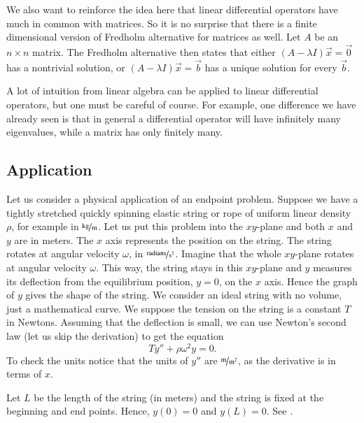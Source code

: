 \documentclass[12pt]{book}
\begin{document}
We also want to reinforce the idea here that linear differential operators have
much in common with matrices.  So it is no surprise that
there is a finite dimensional version of Fredholm alternative for matrices as
well.  Let $A$ be an $n \times n$ matrix.  The Fredholm alternative then
states that either $(A-\lambda I) \vec{x}
= \vec{0}$ has a nontrivial solution, or $(A-\lambda I) \vec{x} = \vec{b}$
has a unique solution for every $\vec{b}$.

A lot of intuition from linear algebra can be applied to linear differential
operators, but one must be careful of course.  For example, one 
difference we have already seen is that in general a differential operator
will have infinitely many eigenvalues, while a matrix has only finitely many.

\subsection{Application}

Let us consider a physical application of an endpoint problem.
Suppose we have a tightly stretched quickly spinning elastic
string or rope of uniform linear density $\rho$, for example in
$\unitfrac{kg}{m}$.
Let us put this problem into the $xy$-plane and both $x$ and $y$
are in meters.  The $x$ axis represents the
position on the string.  The string rotates at angular velocity $\omega$,
in $\unitfrac{radians}{s^2}$.
Imagine that the whole $xy$-plane rotates at angular velocity $\omega$.
This way, the string stays in this $xy$-plane and $y$ 
measures its deflection from the equilibrium position, $y=0$, on the $x$ axis.
Hence the graph of $y$ gives the shape of the string.
We consider an ideal string with
no volume, just a mathematical curve.
We suppose the tension on the string is a constant $T$ in Newtons.
Assuming that the deflection is small,
we can use Newton's second law (let us skip the derivation) to get the equation
\begin{equation*}
T y'' + \rho \omega^2 y = 0 .
\end{equation*}
To check the units notice that the units of $y''$ are $\unitfrac{m}{m^2}$, as the derivative is
in terms of $x$.

Let $L$ be the length of the string (in meters) and the string
is fixed at the beginning and end
points.  Hence, $y(0) = 0$ and $y(L) = 0$.  See
.
\end{document}
